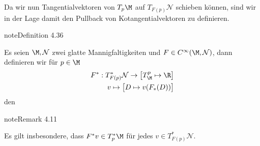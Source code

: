\documentclass[letterpaper,10pt,german]{jupyterBook}
\begin{document}
\sphinxAtStartPar
Da wir nun Tangentialvektoren von \(T_p\M\) auf \(T_{F(p)}\mathcal{N}\) schieben können, sind wir in der Lage damit den Pullback von Kotangentialvektoren zu definieren.
\label{manifolds/diffformen:definition-13}
\begin{sphinxadmonition}{note}{Definition 4.36}



\sphinxAtStartPar
Es seien \(\M,\mathcal{N}\) zwei glatte Mannigfaltigkeiten und \(F\in C^\infty(\M,\mathcal{N})\), dann definieren wir für \(p\in\M\)
\begin{equation*}
\begin{split}F^\ast: T_{F(p)}^\ast\mathcal{N}\to \big[T^p_\M\mapsto\R\big]\\
v \mapsto \big[D\mapsto v(F_\ast(D)) \big]\end{split}
\end{equation*}
\sphinxAtStartPar
den 
\end{sphinxadmonition}
\label{manifolds/diffformen:remark-14}
\begin{sphinxadmonition}{note}{Remark 4.11}



\sphinxAtStartPar
Es gilt insbesondere, dass \(F^\ast v \in T_p^\ast\M\) für jedes \(v\in T_{F(p)}^\ast\mathcal{N}\).
\end{sphinxadmonition}
\end{document}
